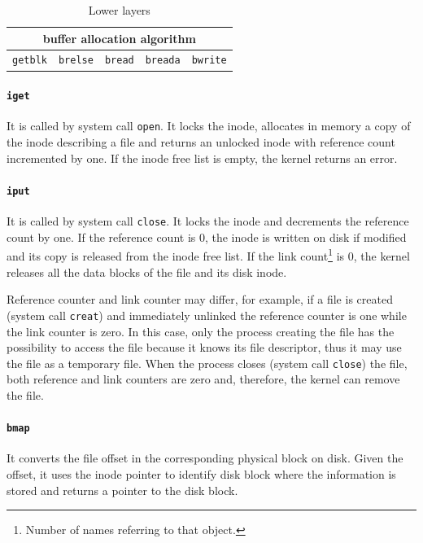 \begin{table}
\centering
\begin{tabular}{|c|c|c|c|c|}
\hline 
\multicolumn{5}{|c|}{buffer allocation algorithm} \\ 
\hline 
\texttt{getblk} & \texttt{brelse} & \texttt{bread} & \texttt{breada} & \texttt{bwrite} \\ 
\hline 
\end{tabular} 
\caption{Lower layers}
\label{system_mgmt_lower_layers}
\end{table}

\paragraph{\texttt{iget}} It is called by system call \texttt{open}. It locks the inode, allocates in memory a copy of the inode describing a file and returns an unlocked inode with reference count incremented by one. If the inode free list is empty, the kernel returns an error.

\paragraph{\texttt{iput}} It is called by system call \texttt{close}. It locks the inode and decrements the reference count by one. If the reference count is 0, the inode is written on disk if modified and its copy is released from the inode free list. If the link count\footnote{Number of names referring to that object.} is 0, the kernel releases all the data blocks of the file and its disk inode.

Reference counter and link counter may differ, for example, if a file is created (system call \texttt{creat}) and immediately unlinked the reference counter is one while the link counter is zero. In this case, only the process creating the file has the possibility to access the file because it knows its file descriptor, thus it may use the file as a temporary file. When the process closes (system call \texttt{close}) the file, both reference and link counters are zero and, therefore, the kernel can remove the file.

\paragraph{\texttt{bmap}} It converts the file offset in the corresponding physical block on disk. Given the offset, it uses the inode pointer to identify disk block where the information is stored and returns a pointer to the disk block.

